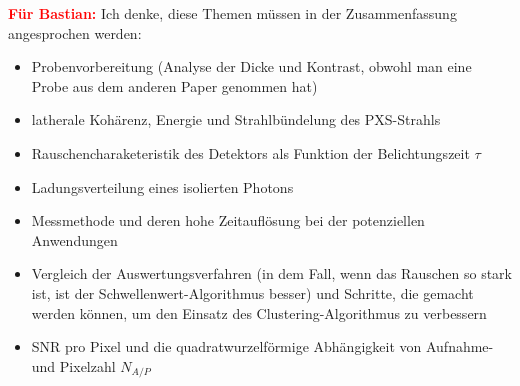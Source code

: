 \textcolor{red}{\textbf{Für Bastian:}}
Ich denke, diese Themen müssen in der Zusammenfassung angesprochen werden:
\begin{itemize}
    \item Probenvorbereitung (Analyse der Dicke und Kontrast, obwohl man eine Probe aus dem anderen Paper genommen hat)
    \item latherale Kohärenz, Energie und Strahlbündelung des PXS-Strahls
    \item Rauschencharaketeristik des Detektors als Funktion der Belichtungszeit $\tau$
    \item Ladungsverteilung eines isolierten Photons
    \item Messmethode und deren hohe Zeitauflösung bei der potenziellen Anwendungen
    \item Vergleich der Auswertungsverfahren (in dem Fall, wenn das Rauschen so stark ist, ist der Schwellenwert-Algorithmus besser) und Schritte, die gemacht werden können, um den Einsatz des Clustering-Algorithmus zu verbessern
    \item SNR pro Pixel und die quadratwurzelförmige Abhängigkeit von Aufnahme- und Pixelzahl $N_{A/P}$
\end{itemize}